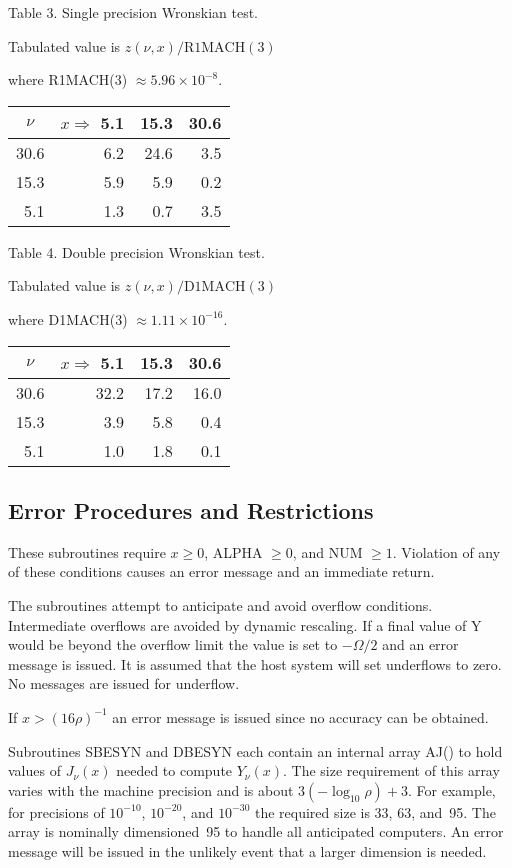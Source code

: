 \documentclass[twoside]{MATH77}
\begin{document}
\begin{center}
\centerline{Table 3. Single precision Wronskian test.}
\centerline{Tabulated value is $z(\nu ,x)/\text{R1MACH}(3)$}
\centerline{where R1MACH(3) $\approx 5.96 \times 10^{-8}.$}\vspace{-5pt}
\begin{tabular}{r|rrr}
\multicolumn{1}{c}{$\nu $} & $x \Rightarrow $ 5.1 & 15.3 & 30.6\\\hline
30.6 & 6.2 & 24.6 & 3.5\\
15.3 & 5.9 & 5.9 & 0.2\\
5.1 & 1.3 & 0.7 & 3.5\\
\end{tabular}\vspace{10pt}

\centerline{Table 4. Double precision Wronskian test.}
\centerline{Tabulated value is $z(\nu ,x)/\text{D1MACH}(3)$}
\centerline{where D1MACH(3) $\approx 1.11 \times 10^{-16}.$}\vspace{-5pt}
\begin{tabular}{r|rrr}
\multicolumn{1}{c}{$\nu $} & $x \Rightarrow $ 5.1 & 15.3 & 30.6\\\hline
30.6 & 32.2 & 17.2 & 16.0\\
15.3 & 3.9 & 5.8 & 0.4\\
5.1 & 1.0 & 1.8 & 0.1
\end{tabular}
\end{center}
\nocite{Olver:1972}
\nocite{Amos:1977:CSI}



\subsection{Error Procedures and Restrictions}

These subroutines require $x \geq 0$, ALPHA $\geq 0$, and NUM $\geq 1$.
Violation of any of these conditions causes an error message and an
immediate return.

The subroutines attempt to anticipate and avoid overflow conditions.
Intermediate overflows are avoided by dynamic rescaling. If a final value of
Y would be beyond the overflow limit the value is set to $-\Omega /2$ and
an error message is issued. It is assumed that the host
system will set underflows to zero. No messages are issued for underflow.

If $x > (16\rho )^{-1}$ an error message is issued
since no accuracy can be obtained.

Subroutines SBESYN and DBESYN each contain an internal array AJ() to hold
values of $J_\nu (x)$ needed to compute $Y_\nu (x)$. The size requirement of
this array varies with the machine precision and is about $3(-\log _{10}
\rho ) + 3$. For example, for precisions of $10^{-10}$, $10^{-20}$,
and $10^{-30}$ the required size is 33, 63, and~95. The array is nominally
dimensioned~95 to handle all anticipated computers. An error message will be
issued in the unlikely event that a larger dimension is needed.
\end{document}
